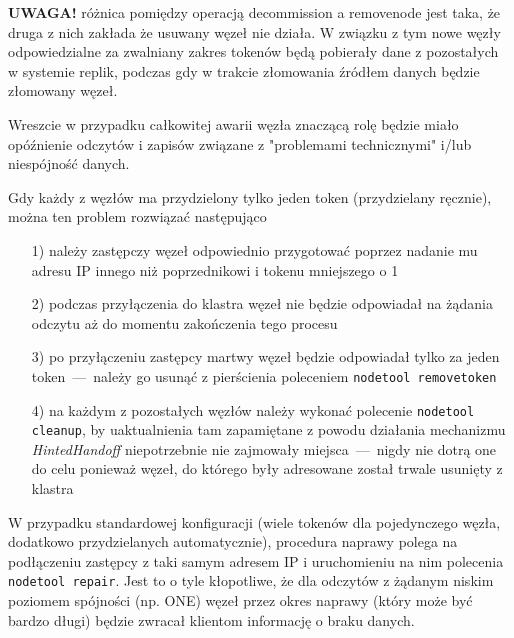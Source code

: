 \documentclass{article} %
\begin{document}
\bigskip

\textbf{UWAGA!} różnica pomiędzy operacją decommission a removenode jest taka, że druga z nich zakłada że usuwany węzeł nie działa.
W związku z tym nowe węzły odpowiedzialne za zwalniany zakres tokenów będą pobierały dane z pozostałych w systemie replik, podczas gdy w trakcie złomowania źródłem danych będzie złomowany węzeł.

\bigskip

\bigskip

Wreszcie w przypadku całkowitej awarii węzła znaczącą rolę będzie miało opóźnienie odczytów i zapisów związane z "problemami technicznymi" i/lub niespójność danych.

Gdy każdy z węzłów ma przydzielony tylko jeden token (przydzielany ręcznie), można ten problem rozwiązać następująco
\begin{enumerate}
\item[1)] należy zastępczy węzeł odpowiednio przygotować poprzez nadanie mu adresu IP innego niż poprzednikowi i tokenu mniejszego o 1
\item[2)] podczas przyłączenia do klastra węzeł nie będzie odpowiadał na żądania odczytu aż do momentu zakończenia tego procesu
\item[3)] po przyłączeniu zastępcy martwy węzeł będzie odpowiadał tylko za jeden token~---~należy go usunąć z pierścienia poleceniem \texttt{nodetool removetoken}
\item[4)] na każdym z pozostałych węzłów należy wykonać polecenie \texttt{nodetool cleanup}, by uaktualnienia tam zapamiętane z powodu działania mechanizmu \emph{HintedHandoff} niepotrzebnie nie zajmowały miejsca~---~nigdy nie dotrą one do celu ponieważ węzeł, do którego były adresowane został trwale usunięty z klastra
\end{enumerate}

W przypadku standardowej konfiguracji (wiele tokenów dla pojedynczego węzła, dodatkowo przydzielanych automatycznie), procedura naprawy polega na podłączeniu zastępcy z taki samym adresem IP i uruchomieniu na nim polecenia \texttt{nodetool repair}. Jest to o tyle kłopotliwe, że dla odczytów z żądanym niskim poziomem spójności (np. ONE) węzeł przez okres naprawy (który może być bardzo długi) będzie zwracał klientom informację o braku danych.

\pagebreak
\end{document}
